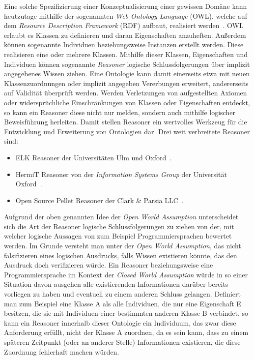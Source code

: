 Eine solche \glqq{}Spezifizierung einer Konzeptualisierung\grqq{} einer gewissen Domäne kann heutzutage mithilfe der sogenannten \textit{Web Ontology Language} (OWL), welche auf dem \textit{Resource Description Framework} (RDF) aufbaut, realisiert werden~\cite{OWL_W3C}\cite{RDF_W3C}.
OWL erlaubt es Klassen zu definieren und daran Eigenschaften anzuheften.
Außerdem können sogenannte Individuen beziehungsweise Instanzen erstellt werden.
Diese realisieren eine oder mehrere Klassen.
Mithilfe dieser Klassen, Eigenschaften und Individuen können sogenannte \textit{Reasoner} logische Schlussfolgerungen über implizit angegebenes Wissen ziehen.
Eine Ontologie kann damit einerseits etwa mit neuen Klassenzuordnungen oder implizit angegeben Vererbungen erweitert, andererseits auf Validität überprüft werden.
Werden Verletzungen von aufgestellten Axiomen oder widersprüchliche Einschränkungen von Klassen oder Eigenschaften entdeckt, so kann ein Reasoner diese nicht nur melden, sondern auch mithilfe logischer Beweisführung herleiten.
Damit stellen Reasoner ein wertvolles Werkzeug für die Entwicklung und Erweiterung von Ontologien dar.
Drei weit verbreitete Reasoner sind: 
\newpage
\begin{itemize}
  \item ELK Reasoner der Universitäten Ulm und Oxford~\cite{Kazakov2014}.
  \item HermiT Reasoner von der \textit{Information Systems Group} der Universität Oxford~\cite{Glimm2014}\cite{HermitReasoner:online}.
  \item Open Source Pellet Reasoner der Clark \& Parsia LLC~\cite{Sirin2007}. 
\end{itemize}
Aufgrund der oben genannten Idee der \textit{Open World Assumption} unterscheidet sich die Art der Reasoner logische Schlussfolgerungen zu ziehen von der, mit welcher logische Aussagen von zum Beispiel Programmiersprachen bewertet werden.
Im Grunde versteht man unter der \textit{Open World Assumption}, das nicht falsifizieren eines logischen Ausdrucks, falls Wissen existieren könnte, das den Ausdruck doch verifizieren würde.
Ein Reasoner beziehungsweise eine Programmiersprache im Kontext der \textit{Closed World Assumption} würde in so einer Situation davon ausgehen alle existierenden Informationen darüber bereits vorliegen zu haben und eventuell zu einem anderen Schluss gelangen.
Definiert man zum Beispiel eine Klasse A als alle Individuen, die nur eine Eigenschaft E besitzen, die sie mit Individuen einer bestimmten anderen Klasse B verbindet, so kann ein Reasoner innerhalb dieser Ontologie ein Individuum, das zwar diese Anforderung erfüllt, nicht der Klasse A zuordnen, da es sein kann, dass zu einem späteren Zeitpunkt (oder an anderer Stelle) Informationen existieren, die diese Zuordnung fehlerhaft machen würden.
